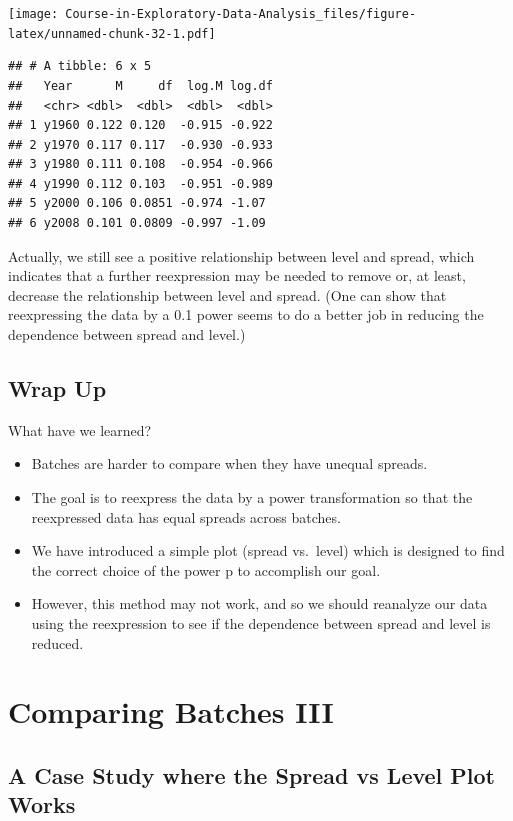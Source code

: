 \documentclass[
]{book}
\providecommand{\tightlist}{%
  \setlength{\itemsep}{0pt}\setlength{\parskip}{0pt}}
\begin{document}
\texttt{[image: Course-in-Exploratory-Data-Analysis\_files/figure-latex/unnamed-chunk-32-1.pdf]}

\begin{verbatim}
## # A tibble: 6 x 5
##   Year      M     df  log.M log.df
##   <chr> <dbl>  <dbl>  <dbl>  <dbl>
## 1 y1960 0.122 0.120  -0.915 -0.922
## 2 y1970 0.117 0.117  -0.930 -0.933
## 3 y1980 0.111 0.108  -0.954 -0.966
## 4 y1990 0.112 0.103  -0.951 -0.989
## 5 y2000 0.106 0.0851 -0.974 -1.07 
## 6 y2008 0.101 0.0809 -0.997 -1.09
\end{verbatim}

Actually, we still see a positive relationship between level and spread, which indicates that a further reexpression may be needed to remove or, at least, decrease the relationship between level and spread. (One can show that reexpressing the data by a 0.1 power seems to do a better job in reducing the dependence between spread and level.)

\hypertarget{wrap-up}{%
\section{Wrap Up}\label{wrap-up}}

What have we learned?

\begin{itemize}
\tightlist
\item
  Batches are harder to compare when they have unequal spreads.
\item
  The goal is to reexpress the data by a power transformation so that the reexpressed data has equal spreads across batches.
\item
  We have introduced a simple plot (spread vs.~level) which is designed to find the correct choice of the power p to accomplish our goal.
\item
  However, this method may not work, and so we should reanalyze our data using the reexpression to see if the dependence between spread and level is reduced.
\end{itemize}

\hypertarget{comparing-batches-iii}{%
\chapter{Comparing Batches III}\label{comparing-batches-iii}}

\hypertarget{a-case-study-where-the-spread-vs-level-plot-works}{%
\section{A Case Study where the Spread vs Level Plot Works}\label{a-case-study-where-the-spread-vs-level-plot-works}}
\end{document}
